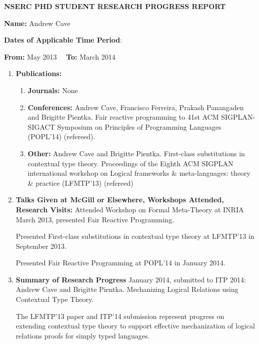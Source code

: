 \documentclass[11pt]{article}
\begin{document}
\begin{center}
\large {\bf NSERC PHD STUDENT RESEARCH PROGRESS REPORT}
\end{center}

\medskip


\textbf{Name:} Andrew Cave

\textbf{Dates of Applicable Time Period}:

\textbf{From:} May 2013            \ \ \textbf{To:} March 2014


\begin{enumerate}

\item \textbf{Publications:}
  \begin{enumerate}
  \item \textbf{Journals:} None

  \item \textbf{Conferences:}
Andrew Cave, Francisco Ferreira, Prakash Panangaden and Brigitte Pientka. Fair reactive programming to 41st ACM SIGPLAN-SIGACT Symposium on Principles of Programming Languages (POPL'14) (refereed).
  \item \textbf{Other:}  
   Andrew Cave and Brigitte Pientka. First-class substitutions in contextual type theory. Proceedings of the Eighth ACM SIGPLAN international workshop on Logical frameworks \& meta-languages: theory \& practice (LFMTP'13) (refereed)

  \end{enumerate}

\item \textbf{Talks Given at McGill or Elsewhere, Workshops Attended, Research Visits:} 
Attended Workshop on Formal Meta-Theory at INRIA March 2013, presented Fair Reactive Programming.

Presented First-class substitutions in contextual type theory at LFMTP'13 in September 2013.

Presented Fair Reactive Programming at POPL'14 in January 2014.
\item \textbf{Summary of Research Progress}
January 2014, submitted to ITP 2014: Andrew Cave and Brigitte Pientka. Mechanizing Logical Relations using Contextual Type Theory.

The LFMTP'13 paper and ITP'14 submission represent progress on extending contextual type theory to support effective mechanization of logical relations proofs for simply typed languages.

\end{enumerate}
\end{document}
